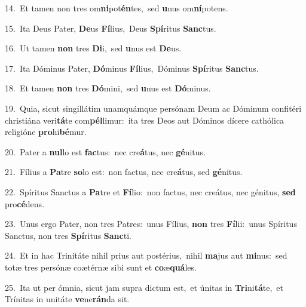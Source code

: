 {\numbfont\textcolor{\numbcolor}{14.}}~Et tamen non tres om\-\textbf{ni}\-pot\-\textbf{én}\-tes,~\star sed \textbf{u}\-nus om\-\textbf{ní}\-potens.\par
{\numbfont\textcolor{\numbcolor}{15.}}~Ita Deus Pater, \textbf{De}\-us \textbf{Fí}\-lius,~\star Deus \textbf{Spí}\-ritus \textbf{Sanc}\-tus.\par
{\numbfont\textcolor{\numbcolor}{16.}}~Ut tamen \textbf{non} tres \textbf{Di}\-i,~\star sed \textbf{u}\-nus est \textbf{De}\-us.\par
{\numbfont\textcolor{\numbcolor}{17.}}~Ita Dóminus Pater, \textbf{Dó}\-minus \textbf{Fí}\-lius,~\star Dóminus \textbf{Spí}\-ritus \textbf{Sanc}\-tus.\par
{\numbfont\textcolor{\numbcolor}{18.}}~Et tamen \textbf{non} tres \textbf{Dó}\-mini,~\star sed \textbf{u}\-nus est \textbf{Dó}\-minus.\par
{\numbfont\textcolor{\numbcolor}{19.}}~Quia, sicut singillátim unamquámque persónam Deum ac Dóminum confitéri christiána veri\-\textbf{tá}\-te com\-\textbf{pél}\-limur:~\star ita tres Deos aut Dóminos dícere cathólica religióne \textbf{pro}\-hi\-\textbf{bé}\-mur.\par
{\numbfont\textcolor{\numbcolor}{20.}}~Pater a \textbf{nul}\-lo est \textbf{fac}\-tus:~\star nec cre\-\textbf{á}\-tus, nec \textbf{gé}\-nitus.\par
{\numbfont\textcolor{\numbcolor}{21.}}~Fílius a \textbf{Pa}\-tre \textbf{so}\-lo est:~\star non factus, nec cre\-\textbf{á}\-tus, sed \textbf{gé}\-nitus.\par
{\numbfont\textcolor{\numbcolor}{22.}}~Spíritus Sanctus a \textbf{Pa}\-tre et \textbf{Fí}\-lio:~\star non factus, nec creátus, nec génitus, \textbf{sed} pro\-\textbf{cé}\-dens.\par
{\numbfont\textcolor{\numbcolor}{23.}}~Unus ergo Pater, non tres Patres:~\dagger unus Fílius, \textbf{non} tres \textbf{Fí}\-lii:~\star unus Spíritus Sanctus, non tres \textbf{Spí}\-ritus \textbf{Sanc}\-ti.\par
{\numbfont\textcolor{\numbcolor}{24.}}~Et in hac Trinitáte nihil prius aut postérius,~\dagger nihil \textbf{ma}\-jus aut \textbf{mi}\-nus:~\star sed totæ tres persónæ coætérnæ sibi sunt et \textbf{co}\-æ\-\textbf{quá}\-les.\par
{\numbfont\textcolor{\numbcolor}{25.}}~Ita ut per ómnia, sicut jam supra dictum est,~\dagger et únitas in \textbf{Tri}\-ni\-\textbf{tá}\-te,~\star et Trínitas in unitáte \textbf{ve}\-ne\-\textbf{rán}\-da sit.\par
